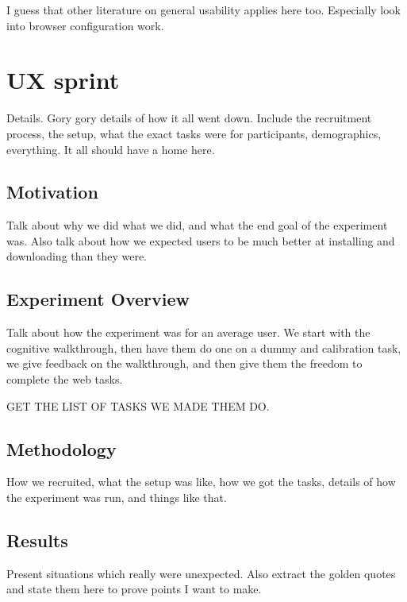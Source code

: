 \documentclass[letterpaper,twocolumn,11pt]{article}
\begin{document}
{\color {red}  I guess that other literature on general usability applies here too. %
Especially look into browser configuration work. }

\indent {}

\indent {}

\appendix

\section{UX sprint} 
\label{sec:pilot}
 {\color {red}Details. Gory gory details of how it all went down. 
Include the recruitment process, the setup, what the exact 
tasks were for participants, demographics, everything. 
It all should have a home here.}

\subsection{Motivation}
{\color {red} Talk about why we did what we did, and what the end goal 
of the experiment was. Also talk about how we expected users
to be much better at installing and downloading than they were. }

\subsection{Experiment Overview}
{\color {red} Talk about how the experiment was for an average user. We start
with the cognitive walkthrough, then have them do one on a dummy
and calibration task, we give feedback on the walkthrough, and then 
give them the freedom to complete the web tasks. 

GET THE LIST OF TASKS WE MADE THEM DO.}

\subsection{Methodology}
{\color {red} How we recruited, what the setup was like, how we got the tasks, details of 
how the experiment was run, and things like that.}

\subsection{Results}
{\color {red} Present situations which really were unexpected. 
Also extract the golden quotes and state them here 
to prove points I want to make. }
\end{document}
